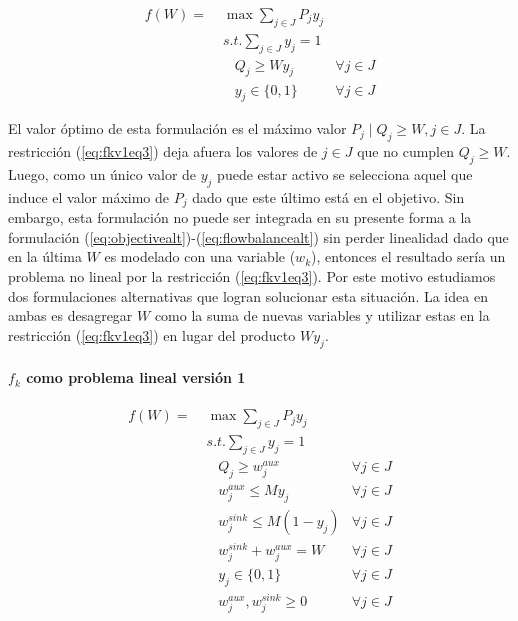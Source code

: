 \begin{align}
  f(W) =\; & \max \sum_{j \in J} P_j y_j    & \label{eq:fkv1eq1} \\
           & s.t. \sum_{j \in J} y_j = 1   & \label{eq:fkv1eq2} \\
           & \;\;\; Q_j \geq W y_j         & \label{eq:fkv1eq3} \forall j \in J \\
           & \;\;\; y_j \in \{0,1\}        & \label{eq:fkv1eq4} \forall j \in J
\end{align}

El valor óptimo de esta formulación es el máximo valor $P_j \;|\; Q_j \geq W, j \in J$. La restricción (\ref{eq:fkv1eq3}) deja afuera los valores de $j \in J$ que no cumplen $Q_j \geq W$. Luego, como un único valor de $y_j$ puede estar activo se selecciona aquel que induce el valor máximo de $P_j$ dado que este último está en el objetivo. Sin embargo, esta formulación no puede ser integrada en su presente forma a la formulación (\ref{eq:objectivealt})-(\ref{eq:flowbalancealt}) sin perder linealidad dado que en la última $W$ es modelado con una variable ($w_k$), entonces el resultado sería un problema no lineal por la restricción (\ref{eq:fkv1eq3}). Por este motivo estudiamos dos formulaciones alternativas que logran solucionar esta situación. La idea en ambas es desagregar $W$ como la suma de nuevas variables y utilizar estas en la restricción (\ref{eq:fkv1eq3}) en lugar del producto $W y_j$.

\paragraph*{$f_k$ como problema lineal versión 1}

\begin{align}
  f(W) =\; & \max \sum_{j \in J} P_j y_j             & \label{eq:fkv3eq1}\\
           & s.t. \sum_{j \in J} y_j = 1            & \label{eq:fkv3eq2}\\
           & \;\;\; Q_j \geq w^{aux}_j              & \forall j \in J \label{eq:fkv3eq3} \\
           & \;\;\; w^{aux}_j \leq M y_j            & \forall j \in J \label{eq:fkv3eq4} \\
           & \;\;\; w^{sink}_j \leq M (1 - y_j)     & \forall j \in J \label{eq:fkv3eq5} \\
           & \;\;\; w^{sink}_j + w^{aux}_j = W      & \label{eq:fkv3eq6} \forall j \in J\\
           & \;\;\; y_j \in \{0,1\}                 & \label{eq:fkv3domainy} \forall j \in J \\
           & \;\;\; w^{aux}_j, w^{sink}_j \geq 0    & \label{eq:fkv3eq7} \forall j \in J
\end{align}

